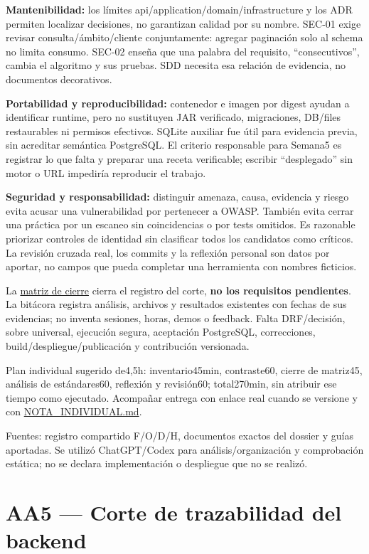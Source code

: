 \documentclass[12pt,a4paper]{report}
\begin{document}
\textbf{Mantenibilidad:} los límites
api/application/domain/infrastructure y los ADR permiten localizar
decisiones, no garantizan calidad por su nombre. SEC-01 exige revisar
consulta/ámbito/cliente conjuntamente: agregar paginación solo al schema
no limita consumo. SEC-02 enseña que una palabra del requisito,
``consecutivos'', cambia el algoritmo y sus pruebas. SDD necesita esa
relación de evidencia, no documentos decorativos.

\textbf{Portabilidad y reproducibilidad:} contenedor e imagen por digest
ayudan a identificar runtime, pero no sustituyen JAR verificado,
migraciones, DB/files restaurables ni permisos efectivos. SQLite
auxiliar fue útil para evidencia previa, sin acreditar semántica
PostgreSQL. El criterio responsable para Semana5 es registrar lo que
falta y preparar una receta verificable; escribir ``desplegado'' sin
motor o URL impediría reproducir el trabajo.

\textbf{Seguridad y responsabilidad:} distinguir amenaza, causa,
evidencia y riesgo evita acusar una vulnerabilidad por pertenecer a
OWASP. También evita cerrar una práctica por un escaneo sin
coincidencias o por tests omitidos. Es razonable priorizar controles de
identidad sin clasificar todos los candidatos como críticos. La revisión
cruzada real, los commits y la reflexión personal son datos por aportar,
no campos que pueda completar una herramienta con nombres ficticios.

La \href{MATRIZ_CIERRE.md}{matriz de cierre} cierra el registro del
corte, \textbf{no los requisitos pendientes}. La bitácora registra
análisis, archivos y resultados existentes con fechas de sus evidencias;
no inventa sesiones, horas, demos o feedback. Falta DRF/decisión, sobre
universal, ejecución segura, aceptación PostgreSQL, correcciones,
build/despliegue/publicación y contribución versionada.

Plan individual sugerido de4,5h: inventario45min, contraste60, cierre de
matriz45, análisis de estándares60, reflexión y revisión60; total270min,
sin atribuir ese tiempo como ejecutado. Acompañar entrega con enlace
real cuando se versione y con \url{NOTA_INDIVIDUAL.md}.

Fuentes: registro compartido F/O/D/H, documentos exactos del dossier y
guías aportadas. Se utilizó ChatGPT/Codex para análisis/organización y
comprobación estática; no se declara implementación o despliegue que no
se realizó.

\nocite{*}


\appendix
\chapter{AA5 --- Corte de trazabilidad del
backend}\label{AA5-semana-5-anexo0-aa5--corte-de-trazabilidad-del-backend}
\end{document}
